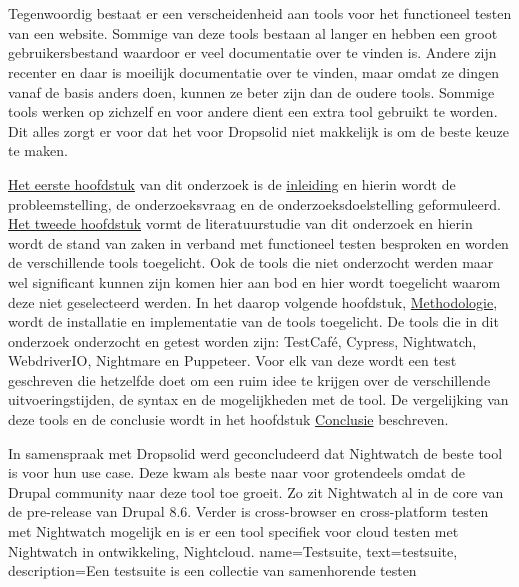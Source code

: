 
\chapter*{}
Tegenwoordig bestaat er een verscheidenheid aan \glspl{tool} voor het functioneel testen van een website. Sommige van deze \glspl{tool} bestaan al langer en hebben een groot gebruikersbestand waardoor er veel documentatie over te vinden is. Andere zijn recenter en daar is moeilijk documentatie over te vinden, maar omdat ze dingen vanaf de basis anders doen, kunnen ze beter zijn dan de oudere \glspl{tool}. Sommige \glspl{tool} werken op zichzelf en voor andere dient een extra \gls{tool} gebruikt te worden. Dit alles zorgt er voor dat het voor Dropsolid niet makkelijk is om de beste keuze te maken.

\hyperref[ch:inleiding]{Het eerste hoofdstuk} van dit onderzoek is de \hyperref[ch:inleiding]{inleiding} en hierin wordt de probleemstelling, de onderzoeksvraag en de onderzoeksdoelstelling geformuleerd. \hyperref[ch:stand-van-zaken]{Het tweede hoofdstuk} vormt de literatuurstudie van dit onderzoek en hierin wordt de stand van zaken in verband met functioneel testen besproken en worden de verschillende \glspl{tool} toegelicht. Ook de \glspl{tool} die niet onderzocht werden maar wel significant kunnen zijn komen hier aan bod en hier wordt toegelicht waarom deze niet geselecteerd werden. In het daarop volgende hoofdstuk, \hyperref[ch:methodologie]{Methodologie}, wordt de installatie en implementatie van de \glspl{tool} toegelicht.  De \glspl{tool} die in dit onderzoek onderzocht en getest worden zijn: TestCafé, Cypress, Nightwatch, WebdriverIO, Nightmare en Puppeteer. Voor elk van deze wordt een test geschreven die hetzelfde doet om een ruim idee te krijgen over de verschillende uitvoeringstijden, de syntax en de mogelijkheden met de \gls{tool}. De vergelijking van deze \glspl{tool} en de conclusie wordt in het hoofdstuk \hyperref[ch:conclusie]{Conclusie} beschreven.

In samenspraak met Dropsolid werd geconcludeerd dat Nightwatch de beste \gls{tool} is voor hun use case. Deze kwam als beste naar voor grotendeels omdat de Drupal community naar deze \gls{tool} toe groeit. Zo zit Nightwatch al in de core van de pre-release van Drupal 8.6. Verder is cross-browser en cross-platform testen met Nightwatch mogelijk en is er een \gls{tool} specifiek voor cloud testen met Nightwatch in ontwikkeling, Nightcloud.
{
    name=Testsuite,
    text=testsuite,
    description={Een testsuite is een collectie van samenhorende testen}
}

